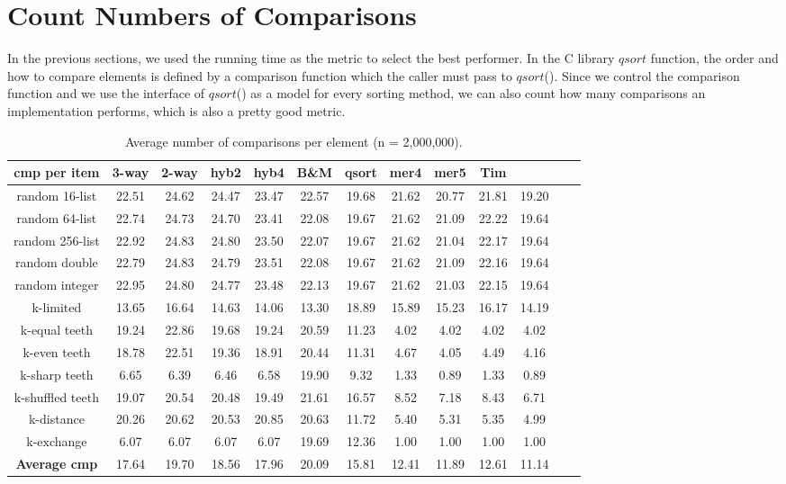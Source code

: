 \documentclass[AMA,STIX1COL]{WileyNJD-v2}
\newcommand{\qsort}{$qsort$ }
\newcommand{\qsortn}{$qsort$}
\begin{document}
\section{Count Numbers of Comparisons} 
In the previous sections, we used the running time as the metric to select the best performer. 
In the C library \qsort function, the order and how to compare elements is defined by a comparison function which the caller must pass to \qsortn(). 
Since we control the comparison function and we use the interface of \qsortn() as a model for every sorting method, we can also count how many comparisons an implementation performs, which is also a pretty good metric.

\begin{table}
\caption{Average number of comparisons per element (n = 2,000,000).}
\centering
\begin{tabular}{|c|c|c|c|c|c|c|c|c|c|c|c|c|}
\toprule
cmp per item & 3-way & 2-way & hyb2 & hyb4 & B\&M& qsort & mer4 & mer5 & Tim \\
\midrule
random 16-list	&22.51	&24.62&	24.47&	23.47&	22.57&	19.68&	21.62&	20.77&	21.81&	19.20\\
random 64-list&	22.74	&24.73	&24.70	&23.41	&22.08	&19.67	&21.62	&21.09	&22.22	&19.64\\
random 256-list&	22.92&	24.83&	24.80&	23.50&	22.07&	19.67&	21.62&	21.04&	22.17&	19.64\\
random double&	22.79	&24.83	&24.79	&23.51	&22.08	&19.67	&21.62	&21.09	&22.16	&19.64\\
random integer&	22.95	&24.80	&24.77	&23.48	&22.13	&19.67	&21.62	&21.03	&22.15	&19.64\\
k-limited&	13.65	&16.64&	14.63&	14.06&	13.30&	18.89&	15.89&	15.23&	16.17&	14.19\\
k-equal teeth&	19.24	&22.86	&19.68	&19.24	&20.59	&11.23	&4.02	&4.02	&4.02	&4.02\\
k-even teeth&	18.78&	22.51&	19.36&	18.91&	20.44&	11.31&	4.67&	4.05&	4.49&	4.16\\
k-sharp teeth&	6.65	&6.39	&6.46	&6.58	&19.90	&9.32	&1.33	&0.89	&1.33	&0.89\\
k-shuffled teeth&	19.07&	20.54&	20.48&	19.49&	21.61&	16.57&	8.52&	7.18&	8.43&	6.71\\
k-distance&	20.26	&20.62	&20.53	&20.85	&20.63	&11.72	&5.40	&5.31	&5.35&	4.99\\
k-exchange&	6.07&	6.07&	6.07&	6.07&	19.69&	12.36&	1.00&	1.00&	1.00&	1.00\\
\textbf{Average  cmp}&	17.64	&19.70	&18.56	&17.96	&20.09	&15.81	&12.41	&11.89	&12.61	&11.14\\
\bottomrule
\end{tabular}
\label{table4}
\end{table}
\end{document}
